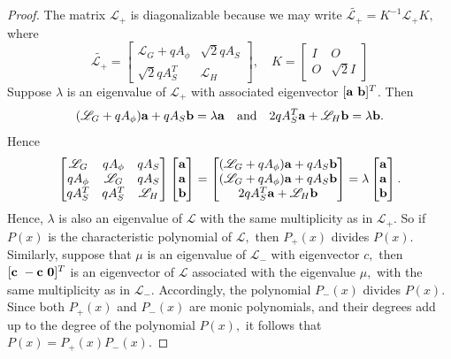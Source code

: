 \documentclass[12pt,a4paper]{article}
\def \o {{\bf 0}}
\def \a {{\bf a}}
\def \b {{\bf b}}
\def \c {{\bf c}}
\begin{document}
 \begin{proof}
The matrix $\mathscr{L}_+$ is diagonalizable because we may write $\widetilde{\mathscr{L}_+}= K^{-1}\mathscr{L}_+ K,$ where
\begin{equation}
\label{L+}
\widetilde{\mathscr{L}_+}=\begin{bmatrix}
		\mathscr{L}_G+qA_\phi&\sqrt{2}q A_S\\
		\sqrt{2}qA_S^T & \mathscr{L}_H
\end{bmatrix}, \quad K=\begin{bmatrix}
		I& O\\
		O & \sqrt{2}I
	\end{bmatrix}
\end{equation}
Suppose $\lambda$ is an eigenvalue of $\mathscr{L}_+$ with associated eigenvector $[\a~ \b]^T$. Then 
\begin{equation*}
(\mathscr{L}_G+qA_\phi)\a+qA_S\b=\lambda \a\quad \text{and} \quad 2qA_S^T\a+\mathscr{L}_H\b=\lambda \b.
\end{equation*}
Hence
$$\begin{bmatrix}
		\mathscr{L}_G& qA_\phi& qA_S\\
		qA_\phi &\mathscr{L}_G &qA_S\\
		qA_S^T & qA_S^T & \mathscr{L}_H  
\end{bmatrix}\begin{bmatrix}
		\a\\ \a\\ \b
	\end{bmatrix}=\begin{bmatrix}
		(\mathscr{L}_G+qA_\phi)\a+qA_S \b\\
		(\mathscr{L}_G+qA_\phi)\a+qA_S \b\\
		2qA_S^T \a+\mathscr{L}_H\b
	\end{bmatrix}=\lambda \begin{bmatrix}
		\a\\ \a\\ \b  
	\end{bmatrix}.$$  
Hence, $\lambda$ is also an eigenvalue of $\mathscr{L}$ with the same multiplicity as in $\mathscr{L}_+$. So if $P(x)$ is the characteristic polynomial of $\mathscr{L},$ then $P_+(x)$ divides $P(x).$ Similarly, suppose that $\mu$ is an eigenvalue of $\mathscr{L}_{-}$ with eigenvector $c,$ then $[\c~ -\c~ \o]^T$ is an eigenvector of $\mathscr{L}$ associated with the eigenvalue $\mu,$ with the same multiplicity as in $\mathscr{L}_{-}$. Accordingly, the polynomial $P_-(x)$ divides $P(x).$ Since both $P_+(x)$ and $P_-(x)$ are monic polynomials, and their degrees add up to the degree of the polynomial $P(x),$ it follows that $P(x)= P_+(x) P_-(x).$
\end{proof}
\end{document}
